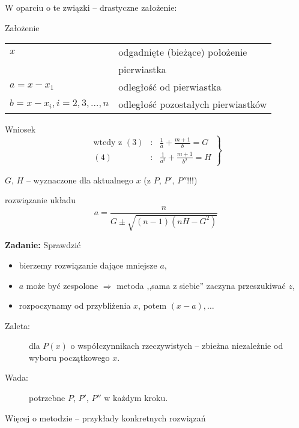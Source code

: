 \begin{frame}
  W oparciu o te związki -- drastyczne założenie:
  \begin{block}{Założenie}
    \begin{tabular}{ll}
      $x$ & odgadnięte (bieżące) położenie \\
      & pierwiastka \\
      $a = x - x_1$ & odległość od pierwiastka \\
      $b = x - x_i, i = 2,3, \dots , n$ & odległość pozostałych pierwiastków
    \end{tabular}
  \end{block}

  \begin{block}{Wniosek}
    $$ \left. \begin{array}{rcl}
      \text{wtedy z } (3) & : & \frac{1}{a} + \frac{m+1}{b} = G \\ %
      (4) & : & \frac{1}{a^2} + \frac{m+1}{b^2} = H
    \end{array} \right\} $$
  \end{block}

$G$, $H$ -- wyznaczone dla aktualnego $x$ (z $P$, $P'$, $P''$!!!)
\end{frame}

\begin{frame}
  \begin{block}{rozwiązanie układu}
    $$a = \frac{n}{G \pm \sqrt{(n-1)(nH-G^2)}}$$
  \end{block}

  \textbf{Zadanie:} Sprawdzić

  \begin{itemize}
    \item bierzemy rozwiązanie dające mniejsze $a$,
    \item $a$ może być zespolone $\Rightarrow$ metoda ,,sama z siebie'' zaczyna przeszukiwać $z$, %
    \item rozpoczynamy od przybliżenia $x$, potem $(x-a),\dots $
  \end{itemize}
\end{frame}

\begin{frame}
  \begin{block}{}
    \begin{description}
      \item[Zaleta:] dla $P(x)$ o współczynnikach rzeczywistych -- zbieżna niezależnie od wyboru początkowego $x$.
      \item[Wada:] potrzebne $P$, $P'$, $P''$ w każdym kroku.
    \end{description}
  \end{block}

  Więcej o metodzie -- przykłady konkretnych rozwiązań \cite{Adams}
\end{frame}
